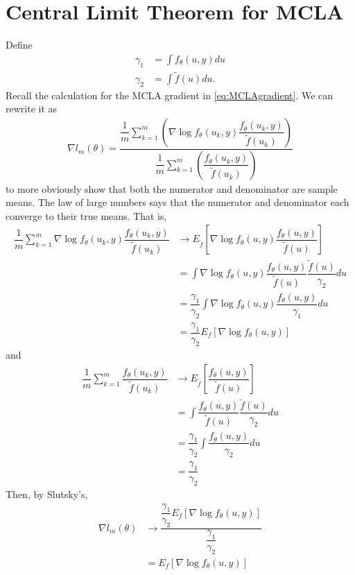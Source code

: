 \documentclass{article}
\begin{document}
\section{Central Limit Theorem for MCLA}
Define
\begin{align}
\gamma_1&= \int f_\theta(u,y) du\\
\gamma_2 &=\int \tilde{f}(u)du.
\end{align}
Recall the calculation for the MCLA gradient in  \eqref{eq:MCLAgradient}. We can rewrite it as
\begin{align}
\nabla l_m(\theta)=  \dfrac{\dfrac{1}{m}\sum_{k=1}^m    \left( \nabla \log f_\theta(u_k,y)   \dfrac{f_\theta(u_k,y)}{\tilde{f}(u_k)} \right)}{\dfrac{1}{m} \sum_{k=1}^m \left( \dfrac{f_\theta(u_k,y)}{\tilde{f}(u_k)} \right) }
\end{align}
to more obviously show that both the numerator and denominator are sample means. 
The law of large numbers says that the numerator and denominator  each converge to their true means. That is,
\begin{align}
\dfrac{1}{m}\sum_{k=1}^m \nabla \log f_\theta (u_k,y)  \dfrac{f_\theta(u_k,y)}{\tilde{f}(u_k)} &\rightarrow  E_{\tilde{f}} \left[ \nabla \log f_\theta (u,y)  \dfrac{f_\theta(u,y)}{\tilde{f}(u)}  \right] \\
&= \int \nabla \log f_\theta (u,y)  \dfrac{f_\theta(u,y)}{\tilde{f}(u)} \dfrac{\tilde{f}(u)}{\gamma_2} du\\
&= \dfrac{\gamma_1}{\gamma_2} \int \nabla \log f_\theta (u,y)  \dfrac{f_\theta(u,y)}{\gamma_1}  du \\
&=\dfrac{\gamma_1}{\gamma_2} E_f \left[ \nabla \log f_\theta(u,y)  \right]
\end{align}
and
\begin{align}
\dfrac{1}{m}\sum_{k=1}^m \dfrac{f_\theta(u_k,y)}{\tilde{f}(u_k)} &\rightarrow E_{\tilde{f}} \left[ \dfrac{f_\theta(u,y)}{\tilde{f}(u)}  \right] \\
&= \int \dfrac{f_\theta(u,y)}{\tilde{f}(u)} \dfrac{\tilde{f}(u)}{\gamma_2} du\\
&= \dfrac{\gamma_1}{\gamma_2} \int \dfrac{ f_\theta(u,y)}{\gamma_2} du \\
&= \dfrac{\gamma_1}{\gamma_2}
\end{align}
Then, by Slutsky's,
\begin{align}
\nabla l_m(\theta)&\rightarrow \dfrac{  \dfrac{\gamma_1}{\gamma_2} E_f \left[ \nabla \log f_\theta(u,y)  \right] }{\dfrac{\gamma_1}{\gamma_2}}\\
&=  E_f \left[ \nabla \log f_\theta(u,y)  \right]
\end{align}
\end{document}
